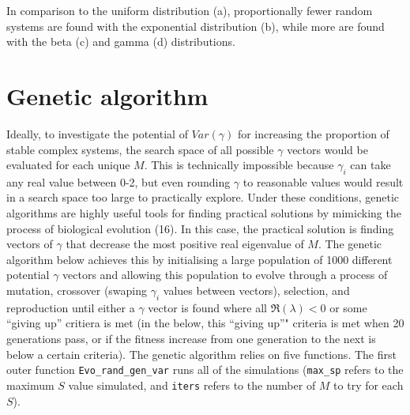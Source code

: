 \documentclass[]{article}
\begin{document}
In comparison to the uniform distribution (a), proportionally fewer
random systems are found with the exponential distribution (b), while
more are found with the beta (c) and gamma (d) distributions.

\hypertarget{ga}{\section{Genetic algorithm}\label{ga}}

Ideally, to investigate the potential of \(Var(\gamma)\) for increasing
the proportion of stable complex systems, the search space of all
possible \(\gamma\) vectors would be evaluated for each unique \(M\).
This is technically impossible because \(\gamma_{i}\) can take any real
value between 0-2, but even rounding \(\gamma\) to reasonable values
would result in a search space too large to practically explore. Under
these conditions, genetic algorithms are highly useful tools for finding
practical solutions by mimicking the process of biological evolution
(16). In this case, the practical solution is finding vectors of
\(\gamma\) that decrease the most positive real eigenvalue of \(M\). The
genetic algorithm below achieves this by initialising a large population
of 1000 different potential \(\gamma\) vectors and allowing this
population to evolve through a process of mutation, crossover (swaping
\(\gamma_{i}\) values between vectors), selection, and reproduction
until either a \(\gamma\) vector is found where all \(\Re(\lambda) < 0\)
or some ``giving up'' critiera is met (in the below, this ``giving up''"
criteria is met when 20 generations pass, or if the fitness increase
from one generation to the next is below a certain criteria). The
genetic algorithm relies on five functions. The first outer function
\texttt{Evo\_rand\_gen\_var} runs all of the simulations
(\texttt{max\_sp} refers to the maximum \(S\) value simulated, and
\texttt{iters} refers to the number of \(M\) to try for each \(S\)).
\end{document}
